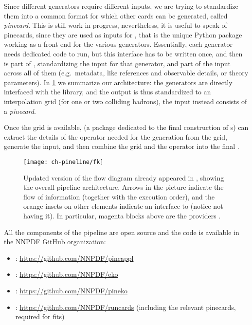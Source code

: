 Since different generators require different inputs, we are trying to
standardize them into a common format for which other cards can be generated,
called \textit{pinecard}.
This is still work in progress, nevertheless, it is useful to speak of
pinecards, since they are used as inputs for \pinefarm, that is the unique
Python package working as a front-end for the various generators.
Essentially, each generator needs dedicated code to run, but this interface has
to be written once, and then is part of \pinefarm, standardizing the input for
that generator, and part of the input across all of them (e.g.\ metadata, like
references and observable details, or theory parameters).
In \cref{fig:pine/pineline} we summarize our architecture: the generators are
directly interfaced with the \pineappl library, and the output is thus
standardized to an interpolation grid (for one or two colliding hadrons), the
input instead consists of a \textit{pinecard}.

Once the grid is available, \pineko (a package dedicated to the final
construction of \fktab{}s) can extract the details of the operator needed for
the \fktab generation from the grid, generate the \eko input, and then combine
the grid and the operator into the final \fktab.

\begin{figure}
  \centering
  \texttt{[image: ch-pineline/fk]}
  \caption{
    Updated version of the flow diagram already appeared in
    \cite{Amoroso:2022eow}, showing the overall pipeline architecture.
    Arrows in the picture indicate the flow of information (together with the
    execution order), and the orange insets on other elements indicate an
    interface to \pineappl (notice \eko not having it).
    In particular, magenta blocks above \pinefarm are the providers
    \cite{Grazzini:2017mhc,Frederix:2018nkq,Carli:2010rw,candido_alessandro_2022_6285149,Britzger:2012bs,Anastasiou:2003ds}.
  }
  \label{fig:pine/pineline}
  \vspace*{-5pt}
\end{figure}

All the components of the pipeline are open source and the code is available in
the NNPDF GitHub organization:
\begin{itemize}
  \setlength\itemsep{2pt}
  \item \pineappl: \url{https://github.com/NNPDF/pineappl}
  \item \eko: \url{https://github.com/NNPDF/eko}
  \item \pineko: \url{https://github.com/NNPDF/pineko}
  \item \pinefarm: \url{https://github.com/NNPDF/runcards} (including the
    relevant pinecards, required for \nnpdf fits)
\end{itemize}

